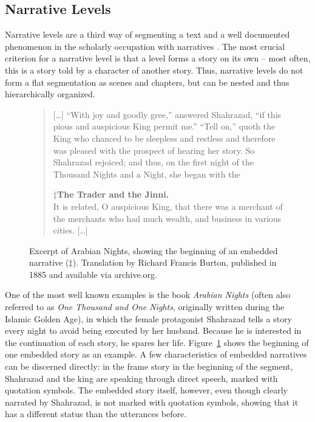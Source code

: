 \documentclass[10pt, a4paper]{article}
\begin{document}
\subsection{Narrative Levels}
Narrative levels are a third way of segmenting a text and a well documented phenomenon in the scholarly occupation with narratives \cite[43\,ff.]{Bal:1997aa}. The most crucial criterion for a narrative level is that a level forms a story on its own -- most often, this is a story told by a character of another story. Thus, narrative levels do not form a flat segmentation as scenes and chapters, but can be nested and thus hierarchically organized. 

\begin{figure}
\begin{quote}
[\dots] \enquote{With joy and goodly gree,} answered Shahrazad, \enquote{if this pious and auspicious King permit me.} \enquote{Tell on,} quoth the King who chanced to be sleepless and restless and therefore was pleased with the prospect of hearing her story. So Shahrazad rejoiced; and thus, on the first night of the Thousand Nights and a Night, she began with the

\noindent$\ddagger$\textbf{The Trader and the Jinni.}\\
\noindent It is related, O auspicious King, that there was a merchant of the merchants who had much wealth, and business in various cities. [\dots]
\end{quote}
\caption{Excerpt of Arabian Nights, showing the beginning of an embedded narrative ($\ddagger$). Translation by Richard Francis Burton, published in 1885 and available via archive.org.}
\label{fig:arabian-nights}
\end{figure}

One of the most well known examples is the book \textit{Arabian Nights} (often also referred to as \textit{One Thousand and One Nights}, originally written during the Islamic Golden Age), in which the female protagonist Shahrazad tells a story every night to avoid being executed by her husband. Because he is interested in the continuation of each story, he spares her life. Figure~\ref{fig:arabian-nights} shows the beginning of one embedded story as an example. A few characteristics of embedded narratives can be discerned directly: in the frame story in the beginning of the segment, Shahrazad and the king are speaking through direct speech, marked with quotation symbols. The embedded story itself, however, even though clearly narrated by Shahrazad, is not marked with quotation symbols, showing that it has a different status than the utterances before.
\end{document}
